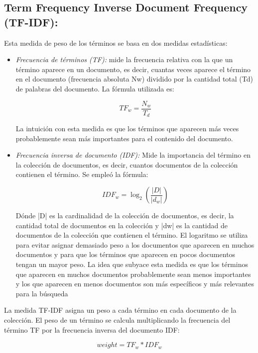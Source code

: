 \documentclass[a4paper,12pt]{article}
\begin{document}
\subsection{Term Frequency Inverse Document Frequency (TF-IDF):}
Esta medida de peso de los términos se basa en dos medidas estadísticas:
\begin{itemize}
    \item \emph{Frecuencia de términos (TF):} mide la frecuencia relativa con la que un término aparece
    en un documento, es decir, cuantas veces aparece el término en el documento
    (frecuencia absoluta Nw) dividido por la cantidad total (Td) de palabras del documento. La
    fórmula utilizada es:
    
    \begin{center}    
    \begin{equation}
        TF_w = \frac{N_w}{T_d}
    \end{equation}
    \end{center}
    La intuición con esta medida es que los términos que aparecen más veces
    probablemente sean más importantes para el contenido del documento.

    \item \emph{Frecuencia inversa de documento (IDF):} Mide la importancia del término en la colección
    de documentos, es decir, cuantos documentos de la colección contienen el término.
    Se empleó la fórmula:
        \begin{center}
        \begin{equation}
         IDF_w = \log_2(\frac{|D|}{|d_w|})   
        \end{equation}
        \end{center}

    Dónde |D| es la cardinalidad de la colección de documentos, es decir, la cantidad total
    de documentos en la colección y |dw| es la cantidad de documentos de la colección que
    contienen el término. El logaritmo se utiliza para evitar asignar demasiado peso 
    a los documentos que aparecen en muchos documentos y para que los términos que aparecen
    en pocos documentos tengan un mayor peso.
    La idea que subyace esta medida es que los términos que aparecen en muchos
    documentos probablemente sean menos importantes y los que aparecen en menos
    documentos son más específicos y más relevantes para la búsqueda
\end{itemize}

La medida TF-IDF asigna un peso a cada término en cada documento de la colección. El peso
de un término se calcula multiplicando la frecuencia del término TF por la frecuencia inversa del
documento IDF:
    \begin{center}
    \begin{equation}
        weight = TF_w * IDF_w 
    \end{equation}
    \end{center}
\end{document}
